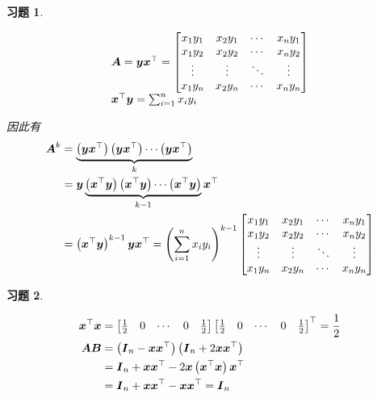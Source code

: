 \documentclass{ctexart}
\newtheorem{problem}{习题}[section]
\begin{document}
\begin{problem}\


\begin{equation*}
    \begin{array}{lll}
        \boldsymbol{A}=\boldsymbol{y}\boldsymbol{x}^\top=
        \begin{bmatrix}
            x_1y_1 & x_2y_1 & \cdots & x_ny_1 \\
            x_1y_2 & x_2y_2 & \cdots & x_ny_2 \\
            \vdots & \vdots & \ddots & \vdots \\
            x_1y_n & x_2y_n & \cdots & x_ny_n \\
        \end{bmatrix}         \\
        \boldsymbol{x}^\top\boldsymbol{y}=\sum_{i=1}^nx_iy_i \\
    \end{array}
\end{equation*}

因此有
\begin{align*}
    \boldsymbol{A}^k & =\underbrace{\left( \boldsymbol{y}\boldsymbol{x}^\top \right)\left( \boldsymbol{y}\boldsymbol{x}^\top \right)\cdots\left( \boldsymbol{y}\boldsymbol{x}^\top \right)}_k                    \\
            & =\boldsymbol{y}\underbrace{\left( \boldsymbol{x}^\top\boldsymbol{y} \right)\left( \boldsymbol{x}^\top\boldsymbol{y} \right)\cdots\left( \boldsymbol{x}^\top\boldsymbol{y} \right)}_{k-1}\boldsymbol{x}^\top \\
            & =\left( \boldsymbol{x}^\top\boldsymbol{y} \right)^{k-1}\boldsymbol{y}\boldsymbol{x}^\top=\left( \sum_{i=1}^nx_iy_i \right)^{k-1}
    \begin{bmatrix}
        x_1y_1 & x_2y_1 & \cdots & x_ny_1 \\
        x_1y_2 & x_2y_2 & \cdots & x_ny_2 \\
        \vdots & \vdots & \ddots & \vdots \\
        x_1y_n & x_2y_n & \cdots & x_ny_n \\
    \end{bmatrix}
\end{align*}

\end{problem}

\begin{problem}\

\begin{align*}
    \boldsymbol{x}^\top\boldsymbol{x} & =
    \begin{bmatrix}
        \frac{1}{2} & 0 & \cdots & 0 & \frac{1}{2}
    \end{bmatrix}
    \begin{bmatrix}
        \frac{1}{2} & 0 & \cdots & 0 & \frac{1}{2}
    \end{bmatrix}^\top=\frac{1}{2}                                        \\
    \boldsymbol{A}\boldsymbol{B}      & =\left( \boldsymbol{I}_n-\boldsymbol{x}\boldsymbol{x}^\top \right)\left( \boldsymbol{I}_n+2\boldsymbol{x}\boldsymbol{x}^\top \right) \\
                    & =\boldsymbol{I}_n+\boldsymbol{x}\boldsymbol{x}^\top-2\boldsymbol{x}\left( \boldsymbol{x}^\top\boldsymbol{x} \right)\boldsymbol{x}^\top \\
                    & =\boldsymbol{I}_n+\boldsymbol{x}\boldsymbol{x}^\top-\boldsymbol{x}\boldsymbol{x}^\top=\boldsymbol{I}_n
\end{align*}

\end{problem}
\end{document}
